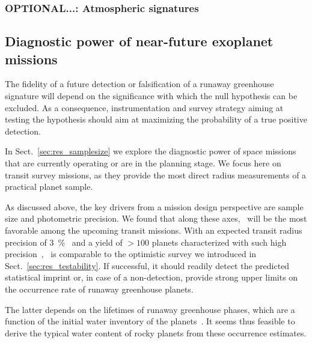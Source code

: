 \documentclass[modern]{aastex631}
\begin{document}



\subsubsection{OPTIONAL...: Atmospheric signatures}


\subsection{Diagnostic power of near-future exoplanet missions}\label{sec:dis_samplesize}
The fidelity of a future detection or falsification of a runaway greenhouse signature will depend on the significance with which the null hypothesis can be excluded.
As a consequence, instrumentation and survey strategy aiming at testing the hypothesis should aim at maximizing the probability of a true positive detection.
\begin{note}
In Sect.~\ref{sec:res_samplesize} we explore the diagnostic power of space missions that are currently operating or are in the planning stage.
We focus here on transit survey missions, as they provide the most direct radius measurements of a practical planet sample.

As discussed above, the key drivers from a mission design perspective are sample size and photometric precision.
We found that along these axes, \plato\ will be the most favorable among the upcoming transit missions.
With an expected transit radius precision of \SI{3}{\percent}~\citep{plato2017} and a yield of $> 100$ planets characterized with such high precision~\citep{Rauer2021}, \plato\ is comparable to the optimistic survey we introduced in Sect.~\ref{sec:res_testability}.
If successful, it should readily detect the predicted statistical imprint or, in case of a non-detection, provide strong upper limits on the occurrence rate of runaway greenhouse planets.

The latter depends on the lifetimes of runaway greenhouse phases, which are a function of the initial water inventory of the planets~\citep{Hamano2015}.
It seems thus feasible to derive the typical water content of rocky planets from these occurrence estimates.
\end{note}
\end{document}

